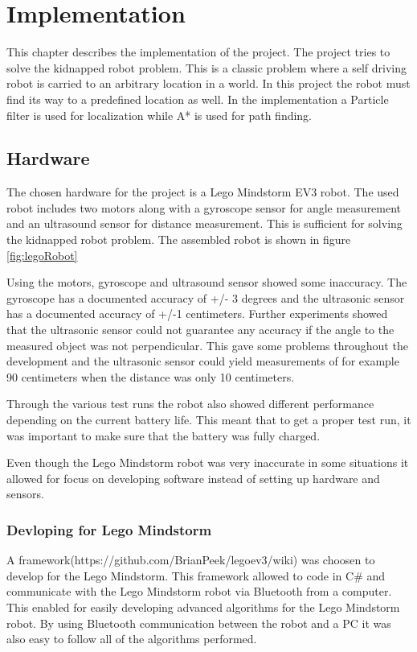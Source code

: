 \chapter{Implementation}
\label{chp:impl}

This chapter describes the implementation of the project. The project tries to solve the kidnapped robot problem. This is a classic problem where a self driving robot is carried to an arbitrary location in a world. In this project the robot must find its way to a predefined location as well. In the implementation a Particle filter is used for localization while A* is used for path finding.

\section{Hardware}
The chosen hardware for the project is a Lego Mindstorm EV3 robot. The used robot includes two motors along with a gyroscope sensor for angle measurement and an ultrasound sensor for distance measurement. This is sufficient for solving the kidnapped robot problem. The assembled robot is shown in figure \ref{fig:legoRobot}

\FloatBarrier

Using the motors, gyroscope and ultrasound sensor showed some inaccuracy.  The gyroscope has a documented accuracy of +/- 3 degrees and the ultrasonic sensor has a documented accuracy of +/-1 centimeters. Further experiments showed that the ultrasonic sensor could not guarantee any accuracy if the angle to the measured object was not perpendicular. This gave some problems throughout the development and the ultrasonic sensor could yield measurements of for example 90 centimeters when the distance was only 10 centimeters. 

Through the various test runs the robot also showed different performance depending on the current battery life. This meant that to get a proper test run, it was important to make sure that the battery was fully charged. 

Even though the Lego Mindstorm robot was very inaccurate in some situations it allowed for focus on developing software instead of setting up hardware and sensors.

\subsection{Devloping for Lego Mindstorm}
A framework(https://github.com/BrianPeek/legoev3/wiki) was choosen to develop for the Lego Mindstorm. This framework allowed to code in C\# and communicate with the Lego Mindstorm robot via Bluetooth from a computer. This enabled for easily developing advanced algorithms for the Lego Mindstorm robot. By using Bluetooth communication between the robot and a PC it was also easy to follow all of the algorithms performed.

